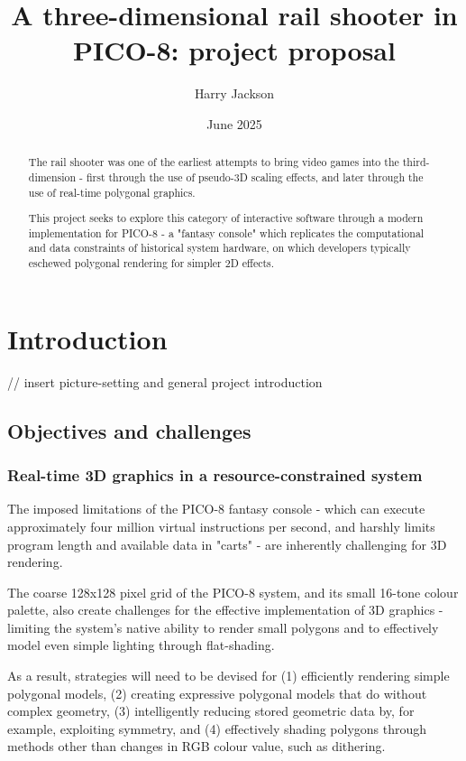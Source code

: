 \documentclass{article}
\title{A three-dimensional rail shooter in PICO-8: project proposal}
\author{Harry Jackson}
\date{June 2025}
\begin{document}
\maketitle

\begin{abstract}
The rail shooter was one of the earliest attempts to bring video
games into the third-dimension - first through the use of pseudo-3D
scaling effects, and later through the use of real-time polygonal graphics.

This project seeks to explore this category of interactive software through a
modern implementation for PICO-8 - a "fantasy console" which replicates the
computational and data constraints of historical system hardware, on which
developers typically eschewed polygonal rendering for simpler 2D effects.
\end{abstract}

\section{Introduction}

// insert picture-setting and general project introduction

\subsection*{Objectives and challenges}

\subsubsection*{Real-time 3D graphics in a resource-constrained system}
The imposed limitations of the PICO-8 fantasy console - which can execute approximately four million
virtual instructions per second, and harshly limits program length and available data in "carts" -
are inherently challenging for 3D rendering.

The coarse 128x128 pixel grid of the PICO-8 system, and its small 16-tone colour palette, also create
challenges for the effective implementation of 3D graphics - limiting the system's native ability to
render small polygons and to effectively model even simple lighting through flat-shading.

As a result, strategies will need to be devised for (1) efficiently rendering simple polygonal
models, (2) creating expressive polygonal models that do without complex geometry, (3) intelligently
reducing stored geometric data by, for example, exploiting symmetry, and (4) effectively shading
polygons through methods other than changes in RGB colour value, such as dithering.
\end{document}
